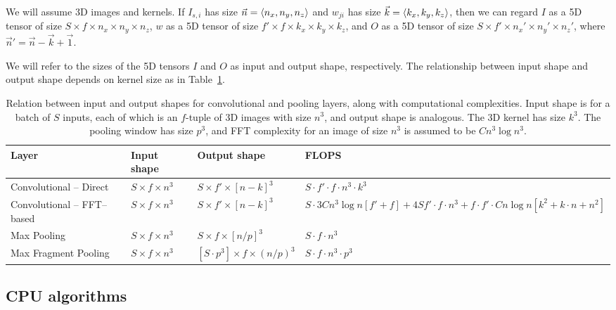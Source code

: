 \documentclass[conference]{./IEEEtran/IEEEtran}
\DeclarePairedDelimiter{\angled}{\langle}{\rangle}
\begin{document}
We will assume 3D images and kernels.  If $I_{s,i}$ has size $\vec{n}
= \angled{n_x, n_y, n_z}$ and $w_{ji}$ has size $\vec{k}
= \angled{k_x,k_y,k_z}$, then we can regard $I$ as a 5D tensor of size
$S \times f \times n_x \times n_y \times n_z$, $w$ as a 5D tensor of size
$f' \times f \times k_x \times k_y \times k_z$, and $O$ as a 5D tensor of
size $S \times f' \times n_x' \times n_y' \times n_z'$, where
$\vec{n}' = \vec{n} - \vec{k} + \vec{1}$.

We will refer to the sizes of the 5D tensors $I$ and $O$ as input and
output shape, respectively.  The relationship between input shape and
output shape depends on kernel size as in
Table~\ref{table:layers_complexity}.

  \begin{table}[t]
    {\footnotesize
    \centering
    \begin{tabular}{l|lll}
      \toprule
      Layer   & Input shape    & Output shape     & FLOPS \\
      \midrule
      Convolutional -- Direct &
      $S \times f \times n^3$ &
      $S \times f' \times [n-k]^3$ &
      $S \cdot f' \cdot f \cdot n^3 \cdot k^3$ \\
      Convolutional -- FFT--based &
      $S \times f \times n^3$ &
      $S \times f' \times [n-k]^3$ &
      $S \cdot 3Cn^3 \log n[f' + f] + 4Sf' \cdot f \cdot n^3 + f \cdot f' \cdot Cn \log n[k^2 + k \cdot n + n^2]$ \\
      Max Pooling &
      $S \times f \times n^3$ &
      $S \times f \times [n/p]^3$ &
      $S \cdot f \cdot n^3$ \\
      Max Fragment Pooling &
      $S \times f \times n^3$ &
      $[S \cdot p^3] \times f \times (n/p)^3$ &
      $S \cdot f \cdot n^3 \cdot p^3$ \\
      \bottomrule
    \end{tabular}
    \caption{Relation between input and output shapes for convolutional and pooling layers, along with computational complexities. Input shape is for a batch of $S$ inputs, each of which is an $f$-tuple of 3D images with size $n^3$, and output shape is analogous. The 3D kernel has size $k^3$. The pooling window has size $p^3$, and FFT complexity for an image of size $n^3$ is assumed to be $C n^3\log n^3$.}
    \label{table:layers_complexity}
    }
  \end{table}


\subsection{CPU algorithms}
\end{document}
